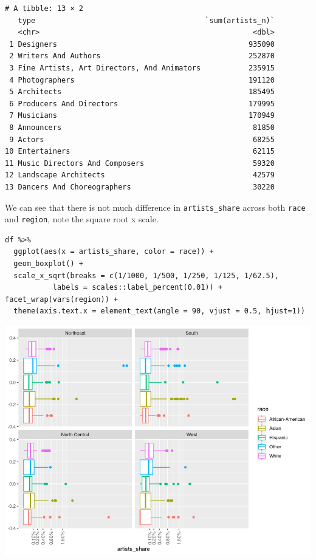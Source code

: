 \documentclass[8pt]{article}
\begin{document}
\begin{verbatim}
# A tibble: 13 × 2
   type                                       `sum(artists_n)`
   <chr>                                                 <dbl>
 1 Designers                                            935090
 2 Writers And Authors                                  252870
 3 Fine Artists, Art Directors, And Animators           235915
 4 Photographers                                        191120
 5 Architects                                           185495
 6 Producers And Directors                              179995
 7 Musicians                                            170949
 8 Announcers                                            81850
 9 Actors                                                68255
10 Entertainers                                          62115
11 Music Directors And Composers                         59320
12 Landscape Architects                                  42579
13 Dancers And Choreographers                            30220
\end{verbatim}


We can see that there is not much difference in \texttt{artists\_share} across both \texttt{race} and \texttt{region}, note the square root x scale.

\begin{verbatim}
df %>%
  ggplot(aes(x = artists_share, color = race)) +
  geom_boxplot() +
  scale_x_sqrt(breaks = c(1/1000, 1/500, 1/250, 1/125, 1/62.5),
	       labels = scales::label_percent(0.01)) + facet_wrap(vars(region)) +
  theme(axis.text.x = element_text(angle = 90, vjust = 0.5, hjust=1))
\end{verbatim}

\begin{center}
\includegraphics[width=.9\linewidth]{media/race_region_boxplot.png}
\end{center}
\end{document}

